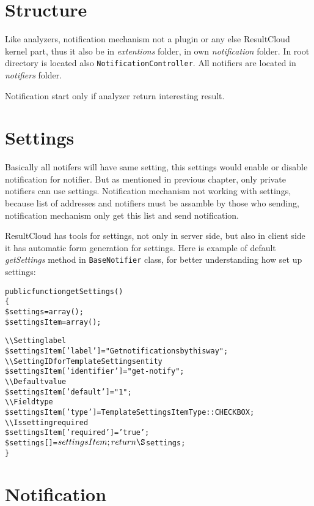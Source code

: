 \section{Structure}

Like analyzers, notification mechanism not a plugin or any else ResultCloud kernel part, thus it also be in \emph{extentions} folder, in own \emph{notification} folder. In root directory is located also \texttt{NotificationController}. All notifiers are located in \emph{notifiers} folder.

Notification start only if analyzer return interesting result.

\section{Settings}

Basically all notifers will have same setting, this settings would enable or disable notification for notifier. But as mentioned in previous chapter, only private notifiers can use settings. Notification mechanism not working with settings, because list of addresses and notifiers must be assamble by those who sending, notification mechanism only get this list and send notification. 

ResultCloud has tools for settings, not only in server side, but also in client side it has automatic form generation for settings. Here is example of default \emph{getSettings} method in \texttt{BaseNotifier} class, for better understanding how set up settings:

\begin{alltt}
public function getSettings()
\{
    \$settings = array();
    \$settingsItem = array();

    \textbackslash\textbackslash Setting label
    \$settingsItem['label'] = "Get notifications by this way";
    \textbackslash\textbackslash Setting ID for TemplateSettings entity
    \$settingsItem['identifier'] = "get-notify";
    \textbackslash\textbackslash Default value
    \$settingsItem['default'] = "1";
    \textbackslash\textbackslash Field type
    \$settingsItem['type'] = TemplateSettingsItemType::CHECKBOX;
    \textbackslash\textbackslash Is setting required
    \$settingsItem['required'] = 'true';
    \$settings[] = $settingsItem;

    return \S$settings; 
\}
\end{alltt}

\section{Notification}


